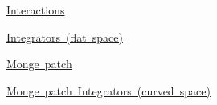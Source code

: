 \mbox{\hyperlink{md_doc_markdown_interactions_md-interactions}{Interactions}}

\mbox{\hyperlink{md_doc_markdown_integrator_md-integrator}{Integrators (flat space)}}

\mbox{\hyperlink{md_doc_markdown_mongepatch_mp-curvature}{Monge patch}}

\mbox{\hyperlink{md_doc_markdown_mp_integrator_mp-integrator}{Monge patch Integrators (curved space)}} 